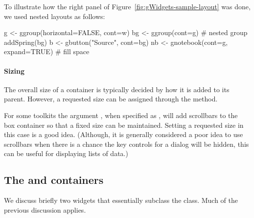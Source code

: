 To illustrate how the right panel of
Figure~\ref{fig:gWidgets-sample-layout} was done, we used nested
layouts as follows:


\begin{Schunk}
\begin{Sinput}
 g <- ggroup(horizontal=FALSE, cont=w)
 bg <- ggroup(cont=g)                    # nested group
 addSpring(bg)
 b <- gbutton("Source", cont=bg)
 nb <- gnotebook(cont=g, expand=TRUE)    # fill space
\end{Sinput}
\end{Schunk}


\paragraph{Sizing}
The overall size of a  container is typically decided by
how it is added to its parent. However, a requested size can be assigned
through the  method. 


For some toolkits the argument ,
when specified as , will add scrollbars to the box
container so that a fixed size can be maintained. Setting a requested
size in this case is a good idea. (Although, it is generally
considered a poor idea to use scrollbars when there is a chance the
key controls for a dialog will be hidden, this can be useful for
displaying lists of data.)






\subsection{The  and  containers}
\label{sec:gWidgets-decorated-cont}

We discuss briefly two widgets that essentially subclass the
 class. Much of the previous discussion applies.

